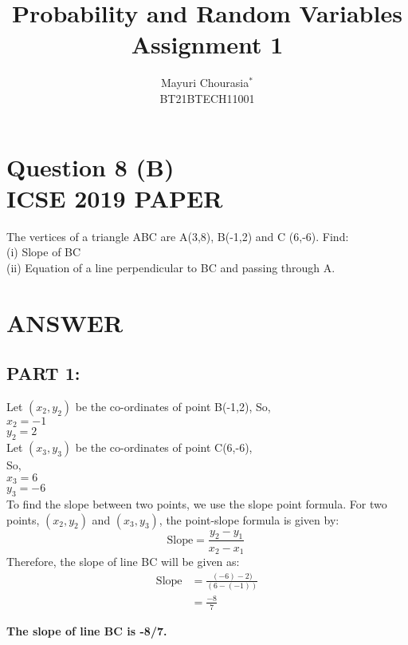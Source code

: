 \documentclass[journal,12pt,twocolumn]{IEEEtran}
\begin{document}
     \title{Probability and Random Variables\\Assignment 1}
     \author{Mayuri Chourasia$^{*}$\\BT21BTECH11001}
     \maketitle
     \section*{\textbf{Question 8 (B)\\ICSE 2019 PAPER}}
     The vertices of a triangle ABC are A(3,8), B(-1,2) and C (6,-6). Find:\\
     (i) Slope of BC\\
     (ii) Equation of a line perpendicular to BC and passing through A.
     \section*{\textbf{ANSWER}}
     \subsection*{PART 1:}
     
     Let $(x_2,y_2)$ be the co-ordinates of point B(-1,2),
     So,\\
     $x_2=-1$\\
     $y_2= 2$\\
     
     Let $(x_3,y_3)$ be the co-ordinates of point C(6,-6),\\
     So,\\
     $x_3= 6$\\
     $y_3= -6$\\
    
     To find the slope between two points, we use the
     slope point formula. For two points, $(x_2,y_2)$ and
     $(x_3,y_3)$, the point-slope formula is given by:\\
     \[\text{Slope} = \frac{y_2-y_1}{x_2-x_1}\ \]
     Therefore, the slope of line BC will be given as:\\
     \begin{align*}
         \text{Slope} &= \frac{(-6)-2)}{(6-(-1))}\\
         &=\frac{-8}{7}
     \end{align*}
     \medskip
     \begin{tcolorbox}
     \begin{center}
         {\textbf{The slope of line BC is -8/7.}}
     \end{center}
     \end{tcolorbox}
\end{document}
